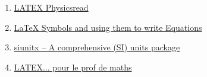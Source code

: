 \documentclass[../main.tex]{subfiles}
\begin{document}
\begin{enumerate}[1. ]
    \item \href{https://www.physicsread.com/latex-vector-bold/}{LATEX Physicsread}
    \item \href{https://physicsanduniverse.com/latex-symbols-and-using-them-to-write-equations/}{LaTeX Symbols and using them to write Equations}
    \item \href{https://texdoc.org/serve/siunitx/0}{siunitx – A comprehensive (SI) units package}
    \item \href{http://math.univ-lyon1.fr/irem/IMG/pdf/LatexPourLeProfDeMaths.pdf}{LATEX... pour le prof de maths }
\end{enumerate}
\end{document}
